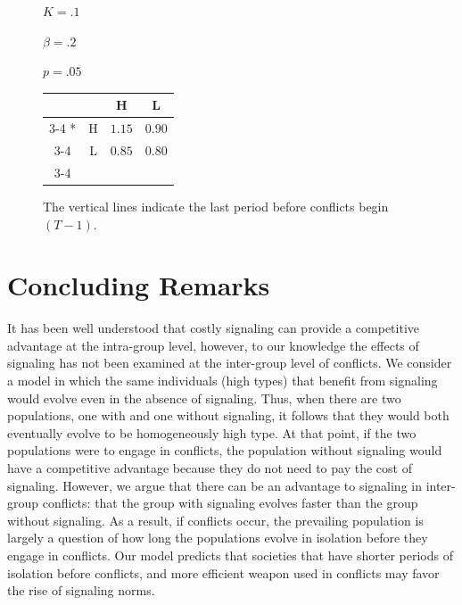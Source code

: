 \begin{figure}[p]
\begin{minipage}[c]{.2\textwidth}
    $K = .1$
    
    $\beta = .2$

    $p = .05$
    \end{minipage}\hfill
  \begin{minipage}[c]{.3\textwidth}
  \begin{tabular}{cc|c|c|}
      & \multicolumn{1}{c}{} & \multicolumn{1}{c}{H}  & \multicolumn{1}{c}{L} \\\cline{3-4}
      \multirow{2}*{}  & H & $1.15$ & $0.90$ \\\cline{3-4}
      & L & $0.85$ & $0.80$ \\\cline{3-4}
    \end{tabular}
    \end{minipage}\hfill
    \begin{minipage}[c]{.3\textwidth}
    The vertical lines indicate the last period before conflicts begin $(T-1)$.
    \end{minipage}
    \end{figure} 


\section{Concluding Remarks}

It has been well understood that costly signaling can provide a competitive advantage at the intra-group level, however, to our knowledge the effects of signaling has not been examined at the inter-group level of conflicts. We consider a model in which the same individuals (high types) that benefit from signaling would evolve even in the absence of signaling. Thus, when there are two populations, one with and one without signaling, it follows that they would both eventually evolve to be homogeneously high type. At that point, if the two populations were to engage in conflicts, the population without signaling would have a competitive advantage because they do not need to pay the cost of signaling. However, we argue that there can be an advantage to signaling in inter-group conflicts: that the group with signaling evolves faster than the group without signaling. As a result, if conflicts occur, the prevailing population is largely a question of how long the populations evolve in isolation before they engage in conflicts. Our model predicts that societies that have shorter periods of isolation before conflicts, and more efficient weapon used in conflicts may favor the rise of signaling norms. 


